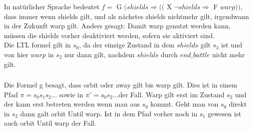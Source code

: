 \documentclass[a4paper,12pt]{scrartcl}
\begin{document}
In natürlicher Sprache bedeutet
$f=$ G $(shields \Rightarrow (($ X $ \neg{shields} \Rightarrow $ F $warp))$,
 dass immer wenn shields gilt, und als nächstes shields nichtmehr gilt, 
irgendwann in der Zukunft warp gilt. Anders gesagt: Damit warp genutzt 
werden kann, müssen die shields vorher deaktiviert werden, sofern sie 
aktiviert sind.\\

Die LTL formel gilt in $s_0$, da der einzige Zustand in dem $shields$ gilt
$s_3$ ist und von hier $warp$ in $s_2$ nur dann gilt, nachdem $shields$ 
durch $end\_battle$ nicht mehr gilt.
\subsubsection{}
Die Formel g besagt, dass orbit oder away gilt bis warp gilt. Dies ist in einem Pfad $\pi = s_0 s_1 s_2 ...$ sowie in $\pi ' = s_0 s_2 ...$der Fall. Warp gilt erst im Zustand $s_2$ und der kann erst betreten werden wenn man aus $s_0$ kommt. Geht man von $s_0$ direkt in $s_2$ dann galt orbit Until warp. Ist in dem Pfad vorher noch in $s_1$ gewesen ist auch orbit Until warp der Fall.
\subsection{}
\end{document}
